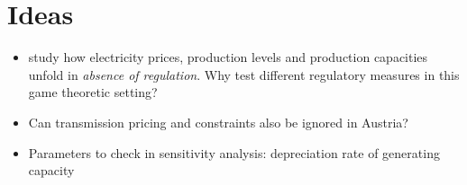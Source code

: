 \section{Ideas}

\begin{itemize}
	\item \cite{Pineau2003} study how electricity prices, production levels and production capacities unfold in \emph{absence of regulation}. Why test different regulatory measures in this game theoretic setting?
	\item Can transmission pricing and constraints also be ignored in Austria?
	\item Parameters to check in sensitivity analysis: depreciation rate of generating capacity
\end{itemize}
